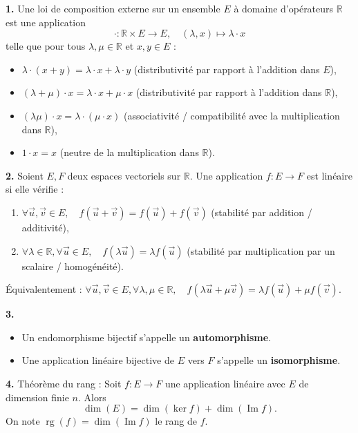 \documentclass[11pt]{article}
\newcommand{\cle}[1]{{\popxbold\color{popdark}#1}}
\begin{document}
\begin{corrige}
\textbf{1.} Une \cle{loi de composition externe} sur un ensemble $E$ à domaine d'opérateurs $\mathbb{R}$ est une application
\[ \cdot : \mathbb{R} \times E \longrightarrow E, \quad (\lambda, x) \longmapsto \lambda \cdot x \]
telle que pour tous $\lambda,\mu\in\mathbb{R}$ et $x,y\in E$ :
\begin{itemize}
    \item $\lambda \cdot (x+y) = \lambda \cdot x + \lambda \cdot y$ (distributivité par rapport à l'addition dans $E$),
    \item $(\lambda+\mu) \cdot x = \lambda \cdot x + \mu \cdot x$ (distributivité par rapport à l'addition dans $\mathbb{R}$),
    \item $(\lambda\mu) \cdot x = \lambda \cdot (\mu \cdot x)$ (associativité / compatibilité avec la multiplication dans $\mathbb{R}$),
    \item $1 \cdot x = x$ (neutre de la multiplication dans $\mathbb{R}$).
\end{itemize}

\textbf{2.} Soient $E,F$ deux espaces vectoriels sur $\mathbb{R}$. Une application $f\colon E\to F$ est \cle{linéaire} si elle vérifie :
\begin{enumerate}
    \item $\forall \vec{u},\vec{v}\in E,\quad f(\vec{u}+\vec{v}) = f(\vec{u})+f(\vec{v})$ (stabilité par addition / additivité),
    \item $\forall \lambda\in\mathbb{R}, \forall \vec{u}\in E,\quad f(\lambda\vec{u}) = \lambda f(\vec{u})$ (stabilité par multiplication par un scalaire / homogénéité).
\end{enumerate}
Équivalentement : $\forall \vec{u},\vec{v}\in E, \forall \lambda,\mu\in\mathbb{R},\quad f(\lambda\vec{u}+\mu\vec{v}) = \lambda f(\vec{u})+\mu f(\vec{v})$.

\textbf{3.}
\begin{itemize}
    \item Un endomorphisme bijectif s'appelle un \textbf{automorphisme}.
    \item Une application linéaire bijective de $E$ vers $F$ s'appelle un \textbf{isomorphisme}.
\end{itemize}

\textbf{4.} \cle{Théorème du rang} : Soit $f\colon E\to F$ une application linéaire avec $E$ de dimension finie $n$. Alors
\[ \dim(E) = \dim(\ker f) + \dim(\operatorname{Im} f). \]
On note $\operatorname{rg}(f) = \dim(\operatorname{Im} f)$ le \cle{rang} de $f$.
\end{corrige}
\end{document}
